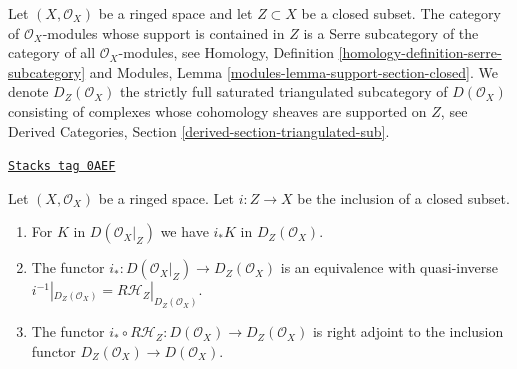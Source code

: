 Let $(X, \mathcal{O}_X)$ be a ringed space and let $Z \subset X$
be a closed subset. The category of $\mathcal{O}_X$-modules whose
support is contained in $Z$ is a Serre subcategory of the
category of all $\mathcal{O}_X$-modules, see
Homology, Definition \ref{homology-definition-serre-subcategory}
and
Modules, Lemma \ref{modules-lemma-support-section-closed}.
We denote $D_Z(\mathcal{O}_X)$
the strictly full saturated triangulated subcategory of
$D(\mathcal{O}_X)$ consisting of complexes whose cohomology sheaves
are supported on $Z$, see
Derived Categories, Section \ref{derived-section-triangulated-sub}.

\begin{lemma}
\label{cohomology-lemma-complexes-with-support-on-closed}
\href{https://stacks.math.columbia.edu/tag/0AEF}{\texttt{Stacks tag 0AEF}}

Let $(X, \mathcal{O}_X)$ be a ringed space. Let $i : Z \to X$ be the
inclusion of a closed subset.
\begin{enumerate}
\item For $K$ in $D(\mathcal{O}_X|_Z)$ we have $i_*K$ in $D_Z(\mathcal{O}_X)$.
\item The functor $i_* : D(\mathcal{O}_X|_Z) \to D_Z(\mathcal{O}_X)$
is an equivalence with quasi-inverse
$i^{-1}|_{D_Z(\mathcal{O}_X)} = R\mathcal{H}_Z|_{D_Z(\mathcal{O}_X)}$.
\item The functor
$i_* \circ R\mathcal{H}_Z : D(\mathcal{O}_X) \to D_Z(\mathcal{O}_X)$
is right adjoint to the inclusion functor
$D_Z(\mathcal{O}_X) \to D(\mathcal{O}_X)$.
\end{enumerate}
\end{lemma}

